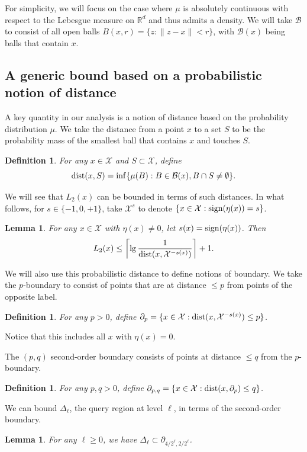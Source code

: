 \documentclass{article}
\def\R{{\mathbb{R}}}
\def\X{{\mathcal X}}
\def\B{{\mathcal B}}
\def\dist{{\rm dist}}
\def\sign{{\rm sign}}
\newtheorem{lemma}[thm]{Lemma}
\newtheorem{defn}[thm]{Definition}
\begin{document}
For simplicity, we will focus on the case where $\mu$ is absolutely continuous with respect to the Lebesgue measure on $\R^d$ and thus admits a density. We will take $\B$ to consist of all open balls $B(x,r) = \{z: \|z-x\| < r\}$, with $\B(x)$ being balls that contain $x$.

\subsection{A generic bound based on a probabilistic notion of distance}

A key quantity in our analysis is a notion of distance based on the probability distribution $\mu$. We take the distance from a point $x$ to a set $S$ to be the probability mass of the smallest ball that contains $x$ and touches $S$.
\begin{defn}
For any $x \in \X$ and $S \subset \X$, define
$$ \dist(x,S) = \inf \{\mu(B): B \in \B(x), B \cap S \neq \emptyset\} .$$ 
\label{defn:prob-dist}
\end{defn}
We will see that $L_2(x)$ can be bounded in terms of such distances. In what follows, for $s \in \{-1,0,+1\}$, take $\X^s$ to denote $\{x \in \X: \sign(\eta(x)) = s\}$.
\begin{lemma}
For any $x \in \X$ with $\eta(x) \neq 0$, let $s(x) = \sign(\eta(x))$. Then
$$ L_2(x) \leq \left\lceil \lg \frac{1}{\dist(x, \X^{-s(x)})} \right\rceil + 1.$$
\label{lemma:L2-bound}
\end{lemma}

We will also use this probabilistic distance to define notions of boundary. We take the $p$-boundary to consist of points that are at distance $\leq p$ from points of the opposite label.
\begin{defn}
For any $p > 0$, define $\partial_p = \{x \in \X: \dist(x, \X^{-s(x)}) \leq p\}$.
\label{defn:boundary}
\end{defn}
Notice that this includes all $x$ with $\eta(x) = 0$.

The $(p,q)$ second-order boundary consists of points at distance $\leq q$ from the $p$-boundary.
\begin{defn}
For any $p,q > 0$, define $\partial_{p,q} = \{x \in \X: \dist(x, \partial_p) \leq q\}$.
\label{defn:boundary2}
\end{defn}

We can bound $\Delta_\ell$, the query region at level $\ell$, in terms of the second-order boundary.
\begin{lemma}
For any $\ell \geq 0$, we have $\Delta_\ell \subset \partial_{4/2^\ell, 2/2^\ell}$.
\label{lemma:delta-continuous}
\end{lemma}
\end{document}
